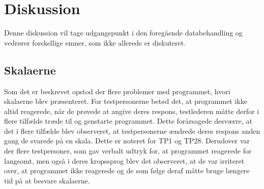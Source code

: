 \chapter{Diskussion}
\label{TestAfSkalaDiskussion}
%
Denne diskussion vil tage udgangspunkt i den foregående databehandling og vedrører forskellige emner, som ikke allerede er diskuteret.  

\section{Skalaerne}
\label{DiskussionSkala}
%
Som det er beskrevet  opstod der flere problemer med programmet, hvori skalaerne blev præsenteret. For testpersonerne betød det, at programmet ikke altid reagerede, når de prøvede at angive deres respons, testlederen måtte derfor i flere tilfælde træde til og genstarte programmet. Dette forårsagede desværre, at det i flere tilfælde blev observeret, at testpersonerne ændrede deres respons anden gang de svarede på en skala. Dette er noteret for TP1 og TP28. Derudover var der flere testpersoner, som gav verbalt udtryk for, at programmet reagerede for langsomt, men også i deres kropssprog blev det observeret, at de var irriteret over, at programmet ikke reagerede og de som følge deraf måtte bruge længere tid på at besvare skalaerne. 

